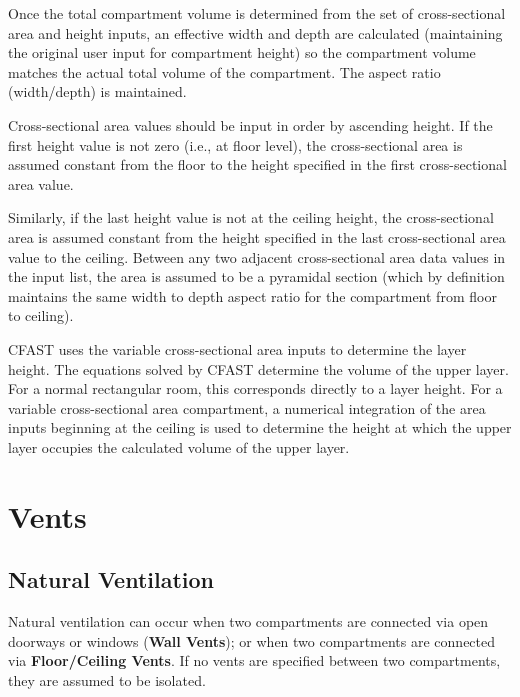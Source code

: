 Once the total compartment volume is determined from the set of cross-sectional area and height inputs, an effective width and depth are calculated (maintaining the original user input for compartment height) so the compartment volume matches the actual total volume of the compartment. The aspect ratio (width/depth) is maintained.

Cross-sectional area values should be input in order by ascending height. If the first height value is not zero (i.e., at floor level), the cross-sectional area is assumed constant from the floor to the height specified in the first cross-sectional area value.

Similarly, if the last height value is not at the ceiling height, the cross-sectional area is assumed constant from the height specified in the last cross-sectional area value to the ceiling. Between any two adjacent cross-sectional area data values in the input list, the area is assumed to be a pyramidal section (which by definition maintains the same width to depth aspect ratio for the compartment from floor to ceiling).

CFAST uses the variable cross-sectional area inputs to determine the layer height. The equations solved by CFAST determine the volume of the upper layer. For a normal rectangular room, this corresponds directly to a layer height. For a variable cross-sectional area compartment, a numerical integration of the area inputs beginning at the ceiling is used to determine the height at which the upper layer occupies the calculated volume of the upper layer.





\chapter{Vents}
\section{Natural Ventilation}

Natural ventilation can occur when two compartments are connected via open doorways or windows (\textbf{Wall Vents}); or when two compartments are connected via \textbf{Floor/Ceiling Vents}. If no vents are specified between two compartments, they are assumed to be isolated.




